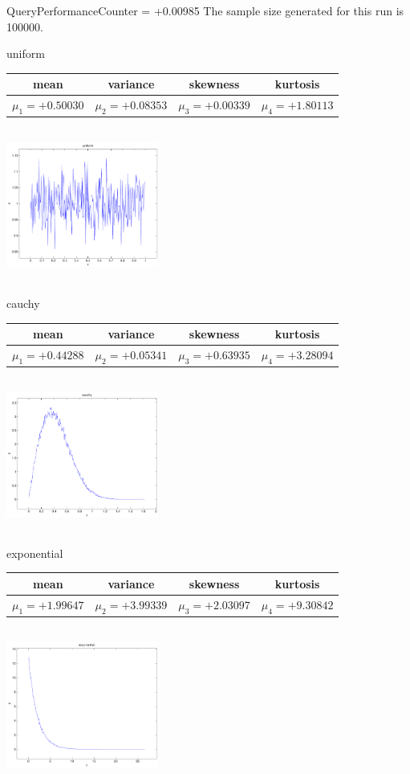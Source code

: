 \documentclass[9pt]{article}
\theoremstyle{plain}
\theoremstyle{definition}
\theoremstyle{remark}
\numberwithin{equation}{section}
\begin{document}
QueryPerformanceCounter  =  +0.00985
The sample size generated for this run is 100000.

\newpage
uniform \begin{tabular}{|c|c|c|c|}  mean & variance & skewness & kurtosis \\  \hline
$\mu_1 = +0.50030$ & $\mu_2 = +0.08353$ & $\mu_3 = +0.00339$ & $\mu_4 =+1.80113$ \\
\end{tabular}

\includegraphics[width=5cm,height=5cm]{uniform.pdf}

cauchy \begin{tabular}{|c|c|c|c|}  mean & variance & skewness & kurtosis \\  \hline
$\mu_1 = +0.44288$ & $\mu_2 = +0.05341$ & $\mu_3 = +0.63935$ & $\mu_4 =+3.28094$ \\
\end{tabular}

\includegraphics[width=5cm,height=5cm]{cauchy.pdf}

exponential \begin{tabular}{|c|c|c|c|}  mean & variance & skewness & kurtosis \\  \hline
$\mu_1 = +1.99647$ & $\mu_2 = +3.99339$ & $\mu_3 = +2.03097$ & $\mu_4 =+9.30842$ \\
\end{tabular}

\includegraphics[width=5cm,height=5cm]{exponential.pdf}
\end{document}

